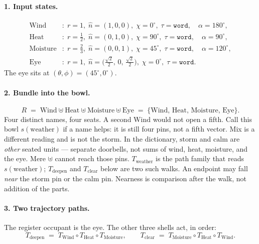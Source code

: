 \documentclass[12pt, a4paper]{article}
\begin{document}
\paragraph{1. Input states.}
\begin{align*}
\mathrm{Wind}&:
  \; r=1,\;
  \hat n=(1,0,0),\;
  \chi=0^\circ,\;
  \tau=\mathtt{word},
  \quad \alpha=180^\circ,\\
\mathrm{Heat}&:
  \; r=\tfrac12,\;
  \hat n=(0,1,0),\;
  \chi=90^\circ,\;
  \tau=\mathtt{word},
  \quad \alpha=90^\circ,\\
\mathrm{Moisture}&:
  \; r=\tfrac23,\;
  \hat n=(0,0,1),\;
  \chi=45^\circ,\;
  \tau=\mathtt{word},
  \quad \alpha=120^\circ,\\
\mathrm{Eye}&:
  \; r=1,\;
  \hat n=\bigl(\tfrac{\sqrt{2}}{2},\,0,\,\tfrac{\sqrt{2}}{2}\bigr),\;
  \chi=0^\circ,\;
  \tau=\mathtt{word}.
\end{align*}
The eye sits at $(\theta,\phi)=(45^\circ,0^\circ)$.

\paragraph{2. Bundle into the bowl.}
\begin{equation}
    R
    \;=\;
    \mathrm{Wind}\uplus\mathrm{Heat}\uplus\mathrm{Moisture}\uplus\mathrm{Eye}
    \;=\;
    \{\mathrm{Wind},\,\mathrm{Heat},\,\mathrm{Moisture},\,\mathrm{Eye}\}.
    \label{eq:storm_bowl}
\end{equation}
Four distinct names, four seats. A second $\mathrm{Wind}$ would not
open a fifth. Call this bowl $s(\mathrm{weather})$ if a name helps:
it is still four pins, not a fifth vector. Mix is a different
reading and is not the storm.
In the dictionary, $\mathrm{storm}$ and $\mathrm{calm}$ are
\emph{other} seated units --- separate doorbells, not sums of
wind, heat, moisture, and the eye. Mere $\uplus$ cannot
reach those pins. $T_{\mathrm{weather}}$ is the path family that
reads $s(\mathrm{weather})$; $T_{\mathrm{deepen}}$ and
$T_{\mathrm{clear}}$ below are two such walks. An endpoint may
fall \emph{near} the storm pin or the calm pin. Nearness is
comparison after the walk, not addition of the parts.

\paragraph{3. Two trajectory paths.}
The register occupant is the eye. The other three shells act, in order:
\begin{equation}
    T_{\mathrm{deepen}}
    \;=\;
    T_{\mathrm{Wind}}\circ T_{\mathrm{Heat}}\circ T_{\mathrm{Moisture}},
    \qquad
    T_{\mathrm{clear}}
    \;=\;
    T_{\mathrm{Moisture}}\circ T_{\mathrm{Heat}}\circ T_{\mathrm{Wind}}.
\end{equation}
\end{document}
